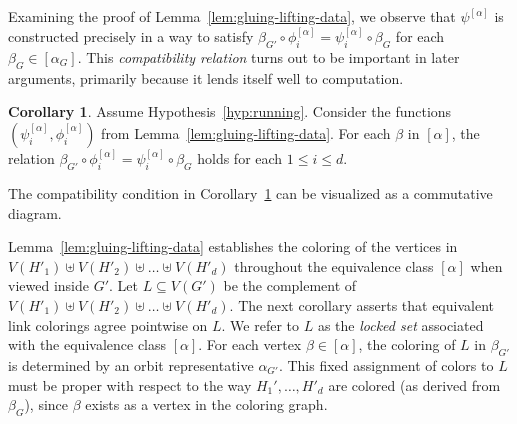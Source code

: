 \documentclass{amsart}
\theoremstyle{hypothesisstyle}
\theoremstyle{definition}
\newtheorem{corollary}[theorem]{Corollary}
\theoremstyle{remark}
\numberwithin{equation}{section}
\begin{document}
Examining the proof of Lemma~\ref{lem:gluing-lifting-data}, we observe that $\psi^{[\alpha]}$ is constructed precisely in a way to satisfy $\beta_{G'} \circ \phi_i^{[\alpha]} = \psi_{i}^{[\alpha]} \circ \beta_{G}$ for each $\beta_{G}\in [\alpha_{G}]$. This \emph{compatibility relation} turns out to be important in later arguments, primarily because it lends itself well to computation. 

\begin{corollary}\label{cor:gluing-relations} Assume Hypothesis~\ref{hyp:running}. Consider the functions $(\psi_i^{[\alpha]}, \phi_i^{[\alpha]})$ from Lemma~\ref{lem:gluing-lifting-data}. For each $\beta$ in $[\alpha]$, the relation  $\beta_{G'} \circ \phi_i^{[\alpha]} = \psi_{i}^{[\alpha]} \circ \beta_{G}$ holds for each $1\leq i\leq d$.
\end{corollary}

The compatibility condition in Corollary~\ref{cor:gluing-relations} can be visualized as a commutative diagram.

\begin{center}
\end{center}

Lemma~\ref{lem:gluing-lifting-data} establishes the coloring of the vertices in $V(H'_1)\uplus V(H'_2)\uplus \dots \uplus V(H'_d)$ throughout the equivalence class $[\alpha]$ when viewed inside $G'$. Let $L\subseteq V(G')$ be the complement of $V(H'_1)\uplus V(H'_2)\uplus \dots \uplus V(H'_d)$. The next corollary asserts that equivalent link colorings agree pointwise on $L$. We refer to $L$ as the \emph{locked set} associated with the equivalence class $[\alpha]$. For each vertex $\beta\in[\alpha]$, the coloring of $L$ in $\beta_{G'}$ is determined by an orbit representative $\alpha_{G'}$. This fixed assignment of colors to $L$ must be proper with respect to the way $H_1',\dots,H'_d$ are colored (as derived from $\beta_{G}$), since $\beta$ exists as a vertex in the coloring graph.
\end{document}
